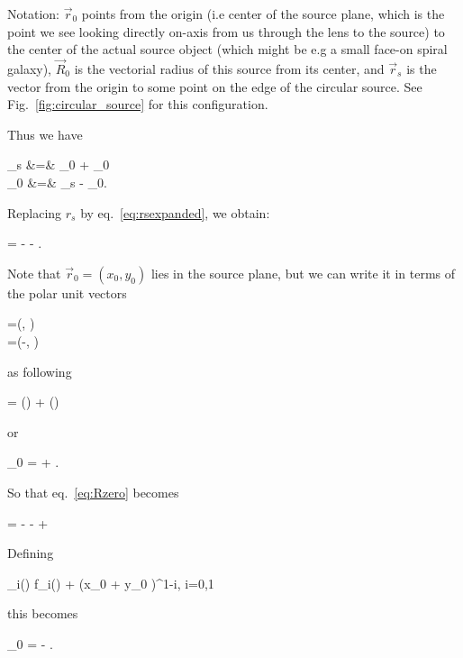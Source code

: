 Notation: $ \vec{r}_{0}$ points from the origin (i.e center of the
source plane, which is the point we see looking directly on-axis from
us through the lens to the source) to the center of the actual source
object (which might be e.g a small face-on spiral galaxy), $
\vec{R}_{0}$ is the vectorial radius of this source from its center,
and $ \vec{r}_{s}$ is the vector from the origin to some point on the
edge of the circular source. See Fig.~\ref{fig:circular_source} for this
configuration.



Thus we have

\bea
{}_s &=&  _{0} + _{0} \\
  _{0} &=& _s - _{0}. \nonumber
\eea


Replacing $r_s$ by eq.~\eqref{eq:rsexpanded}, we obtain:

\beq
\label{eq:Rzero}
 =  -   \hat{\theta} - . \;\;\;
\eeq


Note that $\vec{r}_{0} = (x_0,y_0)$ lies in the source plane, but we
can write it in terms of the polar unit vectors

\bea
\label{eq:unitvs}
=(\cos\te, \sin \te) \\
\hat{\theta}=(-\sin \te, \cos \te)
\eea

 as following

\beq
\vecrz = (\vecrz \cdot \hatth) \hatth + (\vecrz \cdot \hatr) \hatr
\eeq

or

\beq
\label{eq:rzero}
_{0} =   +  \hat{\theta}.  \;\;\;
\eeq

So that eq.~\eqref{eq:Rzero} becomes

\beq
{} =  -   \hat{\theta} -    +  \hat{\theta} \;\;\;
\eeq


Defining

\beq
{}_i(\theta) \equiv f_i(\theta) + (x_0 \cos \te + y_0 \sin \te)\re^{1-i}, \;\; i=0,1
\eeq

this becomes

\beq
{}_{0} =  -   \hat{\theta}. \;\;\; \label{eq:Alard11}
\eeq


